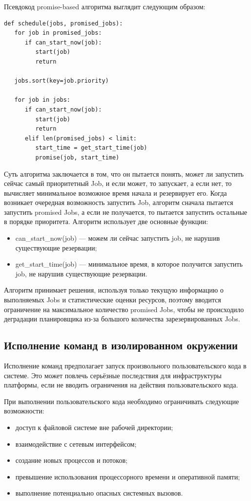 Псевдокод promise-based алгоритма выглядит следующим образом:

\begin{verbatim}
def schedule(jobs, promised_jobs):
   for job in promised_jobs:
      if can_start_now(job):
         start(job)
         return
   
   jobs.sort(key=job.priority)

   for job in jobs:
      if can_start_now(job):
         start(job)
         return
      elif len(promised_jobs) < limit:
         start_time = get_start_time(job)
         promise(job, start_time)
\end{verbatim}

Суть алгоритма заключается в том, что он пытается понять, может ли запустить сейчас самый приоритетный Job,
и если может, то запускает, а если нет, то вычисляет минимальное возможное время начала и резервирует его.
Когда возникает очередная возможность запустить Job, алгоритм сначала пытается запустить promised Jobs,
а если не получается, то пытается запустить остальные в порядке приоритета.
Алгоритм использует две основные функции:
\begin{itemize}
\item can\_start\_now(job) --- можем ли сейчас запустить job, не нарушив существующие резервации;
\item get\_start\_time(job) --- минимальное время, в которое получится запустить job, не нарушив существующие резервации.
\end{itemize}

Алгоритм принимает решения, используя только текущую информацию о выполняемых Jobs и статистические оценки ресурсов,
поэтому вводится ограничение на максимальное количество promised Jobs,
чтобы не происходило деградации планировщика из-за большого количества зарезервированных Jobs.

\subsection{Исполнение команд в изолированном окружении}

Исполнение команд предполагает запуск произвольного пользовательского кода в системе.
Это может повлечь серьёзные последствия для инфраструктуры платформы, если не вводить ограничения на действия пользовательского кода.

При выполнении пользовательского кода необходимо ограничивать следующие возможности:
\begin{itemize}
\item доступ к файловой системе вне рабочей директории;
\item взаимодействие с сетевым интерфейсом;
\item создание новых процессов и потоков;
\item превышение использования процессорного времени и оперативной памяти;
\item выполнение потенциально опасных системных вызовов.
\end{itemize}

